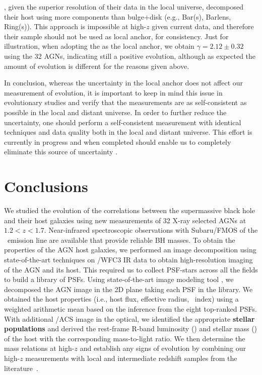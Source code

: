 \documentclass[apj]{emulateapj}
\begin{document}
{\citet{Bentz2018}, given the superior resolution of their data in the local universe, decomposed their host using more components than bulge$+$disk (e.g., Bar(s), Barlens, Ring(s)). This approach is impossible at high-$z$ given current data, and therefore their sample should not be used as local anchor, for consistency.
Just for illustration, when adopting the \citet{Bentz2018} as the local anchor, we obtain $\gamma = 2.12\pm 0.32$ using the 32 AGNs, indicating still a positive evolution, although as expected the amount of evolution is different for the reasons given above.
 }

In conclusion, whereas the uncertainty in the local anchor does not affect our measurement of evolution, it is important to keep in mind this issue in evolutionary studies and verify that the measurements are as self-consistent as possible in the local and distant universe. In order to further reduce the uncertainty, one should perform a self-consistent measurement with identical techniques and data quality both in the local and distant universe. This effort is currently in progress and when completed should enable us to completely eliminate this source of uncertainty \citep{Bennert11,Harris2012, Bennert2015}.


\section{Conclusions} \label{sec:sum}

We studied the evolution of the correlations between the supermassive black hole and their host galaxies using new measurements of 32 X-ray selected AGNs at $1.2<z<1.7$. Near-infrared spectroscopic observations with Subaru/FMOS of the \halpha\ emission line are available that provide reliable BH masses. To obtain the properties of the AGN host galaxies, we performed an image decomposition using state-of-the-art techniques on \hst/WFC3 IR data to obtain high-resolution imaging of the AGN and its host. This required us to collect PSF-stars across all the fields to build a library of PSFs. Using state-of-the-art image modeling tool \lenstronomy, we decomposed the AGN image in the 2D plane taking each PSF in the library. We obtained the host properties (i.e., host flux, effective radius, \sersic\ index) using a weighted arithmetic mean based on the inference from the eight top-ranked PSFs. With additional \hst/ACS image in the optical, we identified the appropriate {\bf stellar populations} and derived the rest-frame R-band luminosity (\lhost) and stellar mass (\smass) of the host with the corresponding mass-to-light ratio.
We then determine the mass relations at high-$z$ and establish any signs of evolution by combining our high-$z$ measurements with local and intermediate redshift samples from the literature~\citep{Park15, Bennert11, SS13, Cisternas2011}. 
\end{document}
